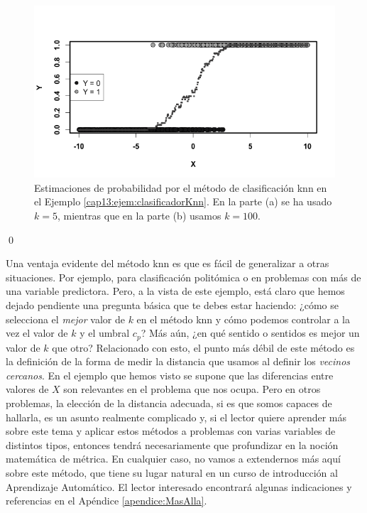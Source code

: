 \begin{ejemplo}
\begin{figure}[tbhp]
\begin{center}
\begin{enColor}
\end{enColor}
\begin{bn}
\includegraphics[width=14cm]{../fig/Cap13-ClasificadorKnn02-bn.png}
\end{bn}
\caption{Estimaciones de probabilidad por el método de clasificación
knn en el Ejemplo \ref{cap13:ejem:clasificadorKnn}. En la parte (a) se ha usado $k=5$, mientras que en la parte (b) usamos $k=100$.	}
\label{cap13:fig:ClasificadorKnn}
\end{center}
\end{figure}
\qed	
\end{ejemplo}
	
Una ventaja evidente del método knn es que es fácil de generalizar a otras situaciones. Por ejemplo, para clasificación politómica o en problemas con más de una variable predictora. Pero, a la vista de este ejemplo, está claro que hemos dejado pendiente una pregunta básica que te debes estar haciendo: ¿cómo se selecciona el {\em mejor} valor de $k$ en el método knn y cómo podemos controlar a la vez el valor de $k$ y el umbral $c_p$? Más aún, ¿en qué sentido o sentidos es mejor un valor de $k$ que otro? Relacionado con esto,  el punto más débil de este método es la definición de la forma de medir la distancia que usamos al definir los {\em vecinos cercanos}. En el ejemplo que hemos visto se supone que las diferencias entre valores de $X$ son relevantes en el problema que nos ocupa. Pero en otros problemas, la elección de la distancia adecuada, si es que somos capaces de hallarla, es un asunto realmente complicado y, si el lector quiere aprender más sobre este tema y aplicar estos métodos a problemas con varias variables de distintos tipos, entonces tendrá necesariamente que profundizar en la noción matemática de métrica. En cualquier caso, no vamos a extendernos más aquí sobre este método, que tiene su lugar natural en un curso de introducción al Aprendizaje Automático. El lector interesado encontrará algunas indicaciones y referencias en el Apéndice \ref{apendice:MasAlla}.

